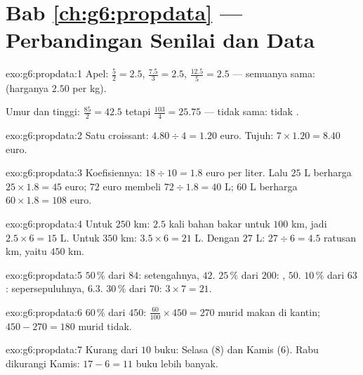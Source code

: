 \section*{Bab \ref{ch:g6:propdata} --- Perbandingan Senilai dan Data}

\begin{solution}{exo:g6:propdata:1}
Apel:  $\frac52 = 2.5$, $\frac{7.5}{3} = 2.5$,
$\frac{12.5}{5} = 2.5$ --- semuanya sama:  (harganya
$2.50$ per kg).

Umur dan tinggi: $\frac{85}{2} = 42.5$ tetapi $\frac{103}{4} = 25.75$
--- tidak sama: tidak .
\end{solution}

\begin{solution}{exo:g6:propdata:2}
Satu croissant: $4.80 \div 4 = 1.20$ euro. Tujuh:
$7 \times 1.20 = 8.40$ euro.
\end{solution}

\begin{solution}{exo:g6:propdata:3}
Koefisiennya: $18 \div 10 = 1.8$ euro per liter. Lalu
$25$ L berharga $25 \times 1.8 = 45$ euro; $72$ euro membeli
$72 \div 1.8 = 40$ L; $60$ L berharga $60 \times 1.8 = 108$ euro.
\end{solution}

\begin{solution}{exo:g6:propdata:4}
Untuk $250$ km: $2.5$ kali bahan bakar untuk $100$ km, jadi
$2.5 \times 6 = 15$ L. Untuk $350$ km: $3.5 \times 6 = 21$ L. Dengan
$27$ L: $27 \div 6 = 4.5$ ratusan km, yaitu $450$ km.
\end{solution}

\begin{solution}{exo:g6:propdata:5}
$50\,\%$ dari $84$: setengahnya, $42$. \quad
$25\,\%$ dari $200$: , $50$. \quad
$10\,\%$ dari $63$: sepersepuluhnya, $6.3$. \quad
$30\,\%$ dari $70$: $3 \times 7 = 21$.
\end{solution}

\begin{solution}{exo:g6:propdata:6}
$60\,\%$ dari $450$: $\frac{60}{100} \times 450 = 270$ murid makan di
kantin; $450 - 270 = 180$ murid tidak.
\end{solution}

\begin{solution}{exo:g6:propdata:7}
Kurang dari $10$ buku: Selasa ($8$) dan Kamis ($6$). Rabu dikurangi
Kamis: $17 - 6 = 11$ buku lebih banyak.
\end{solution}

